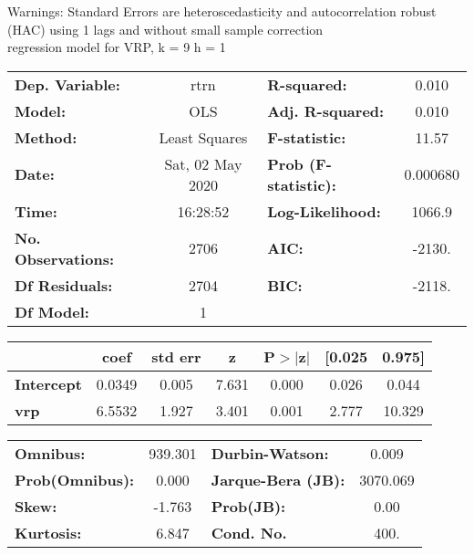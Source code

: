 Warnings: \newline
 [1] Standard Errors are heteroscedasticity and autocorrelation robust (HAC) using 1 lags and without small sample correction\\ 

regression model for VRP, k = 9 h = 1\begin{center}
\begin{tabular}{lclc}
\toprule
\textbf{Dep. Variable:}    &       rtrn       & \textbf{  R-squared:         } &     0.010   \\
\textbf{Model:}            &       OLS        & \textbf{  Adj. R-squared:    } &     0.010   \\
\textbf{Method:}           &  Least Squares   & \textbf{  F-statistic:       } &     11.57   \\
\textbf{Date:}             & Sat, 02 May 2020 & \textbf{  Prob (F-statistic):} &  0.000680   \\
\textbf{Time:}             &     16:28:52     & \textbf{  Log-Likelihood:    } &    1066.9   \\
\textbf{No. Observations:} &        2706      & \textbf{  AIC:               } &    -2130.   \\
\textbf{Df Residuals:}     &        2704      & \textbf{  BIC:               } &    -2118.   \\
\textbf{Df Model:}         &           1      & \textbf{                     } &             \\
\bottomrule
\end{tabular}
\begin{tabular}{lcccccc}
                   & \textbf{coef} & \textbf{std err} & \textbf{z} & \textbf{P$> |$z$|$} & \textbf{[0.025} & \textbf{0.975]}  \\
\midrule
\textbf{Intercept} &       0.0349  &        0.005     &     7.631  &         0.000        &        0.026    &        0.044     \\
\textbf{vrp}       &       6.5532  &        1.927     &     3.401  &         0.001        &        2.777    &       10.329     \\
\bottomrule
\end{tabular}
\begin{tabular}{lclc}
\textbf{Omnibus:}       & 939.301 & \textbf{  Durbin-Watson:     } &    0.009  \\
\textbf{Prob(Omnibus):} &   0.000 & \textbf{  Jarque-Bera (JB):  } & 3070.069  \\
\textbf{Skew:}          &  -1.763 & \textbf{  Prob(JB):          } &     0.00  \\
\textbf{Kurtosis:}      &   6.847 & \textbf{  Cond. No.          } &     400.  \\
\bottomrule
\end{tabular}
\end{center}

